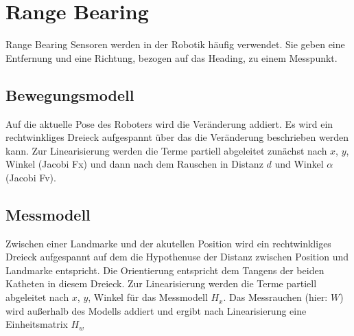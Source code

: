 \chapter{Range Bearing}
\label{chp:rangeBearing}

Range Bearing Sensoren werden in der Robotik häufig verwendet. Sie geben eine Entfernung und eine Richtung, bezogen auf das Heading, zu einem Messpunkt.

\section{Bewegungsmodell}
\label{chp:rangeBearing:sec:bewegungsmodell}

Auf die aktuelle Pose des Roboters wird die Veränderung addiert. Es wird ein rechtwinkliges Dreieck aufgespannt über das die
Veränderung beschrieben werden kann. Zur Linearisierung werden die Terme partiell abgeleitet zunächst nach $x$, $y$, Winkel (Jacobi Fx) und
dann nach dem Rauschen in Distanz $d$ und Winkel $\alpha$ (Jacobi Fv).

\section{Messmodell}
\label{chp:rangeBearing:sec:messmodell}
Zwischen einer Landmarke und der akutellen Position wird ein rechtwinkliges Dreieck aufgespannt auf dem die Hypothenuse der Distanz
zwischen Position und Landmarke entspricht. Die Orientierung entspricht dem Tangens der beiden Katheten in diesem Dreieck. Zur
Linearisierung werden die Terme partiell abgeleitet nach $x$, $y$, Winkel für das Messmodell $H_x$. Das Messrauchen (hier: $W$) wird außerhalb
des Modells addiert und ergibt nach Linearisierung eine Einheitsmatrix $H_w$